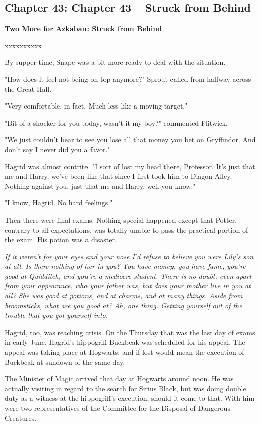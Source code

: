 \documentclass[a4paper,11pt]{article}
\begin{document}
\subsection{Chapter 43: Chapter 43 – Struck from Behind}

\textbf{Two More for Azkaban: Struck from Behind}

xxxxxxxxxx

By supper time, Snape was a bit more ready to deal with the situation.

"How does it feel not being on top anymore?" Sprout called from halfway across the Great Hall.

"Very comfortable, in fact. Much less like a moving target."

"Bit of a shocker for you today, wasn't it my boy?" commented Flitwick.

"We just couldn't bear to see you lose all that money you bet on Gryffindor. And don't say I never did you a favor."

Hagrid was almost contrite. "I sort of lost my head there, Professor. It's just that me and Harry, we've been like that since I first took him to Diagon Alley. Nothing against you, just that me and Harry, well you know."

"I know, Hagrid. No hard feelings."

Then there were final exams. Nothing special happened except that Potter, contrary to all expectations, was totally unable to pass the practical portion of the exam. His potion was a disaster.

\emph{If it weren't for your eyes and your nose I'd refuse to believe you were Lily's son at all. Is there nothing of her in you? You have money, you have fame, you're good at Quidditch, and you're a mediocre student. There is no doubt, even apart from your appearance, who your father was, but does your mother live in you at all? She was good at potions, and at charms, and at many things. Aside from broomsticks, what are you good at? Ah, one thing. Getting yourself out of the trouble that you got yourself into.}

Hagrid, too, was reaching crisis. On the Thursday that was the last day of exams in early June, Hagrid's hippogriff Buckbeak was scheduled for his appeal. The appeal was taking place at Hogwarts, and if lost would mean the execution of Buckbeak at sundown of the same day.

The Minister of Magic arrived that day at Hogwarts around noon. He was actually visiting in regard to the search for Sirius Black, but was doing double duty as a witness at the hippogriff's execution, should it come to that. With him were two representatives of the Committee for the Disposal of Dangerous Creatures.
\end{document}
